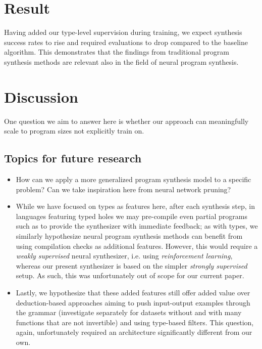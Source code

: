 \documentclass{article}
\begin{document}


\section{Result} %

Having added our type-level supervision during training, we expect synthesis success rates to rise and required evaluations to drop compared to the baseline algorithm.
This demonstrates that the findings from traditional program synthesis methods are relevant also in the field of neural program synthesis.



\section{Discussion} %

One question we aim to answer here is whether our approach can meaningfully scale to program sizes not explicitly train on.

\subsection{Topics for future research}
\begin{itemize}
    \item How can we apply a more generalized program synthesis model to a specific problem? Can we take inspiration here from neural network pruning?
    \item While we have focused on types as features here,
    after each synthesis step,
    in languages featuring typed holes we may pre-compile even partial programs such as to provide the synthesizer with immediate feedback;
    as with types, we similarly hypothesize neural program synthesis methods can benefit from using compilation checks as additional features.
    However, this would require a \emph{weakly supervised} neural synthesizer,
    i.e. using \emph{reinforcement learning},
    whereas our present synthesizer is based on the simpler \emph{strongly supervised} setup.
    As such, this was unfortunately out of scope for our current paper.
    \item Lastly, we hypothesize that these added features still offer added value over deduction-based approaches aiming to push input-output examples through the grammar (investigate separately for datasets without and with many functions that are not invertible) and using type-based filters. This question, again, unfortunately required an architecture significantly different from our own.
\end{itemize}


\nocite{*}
% 

\end{document}
